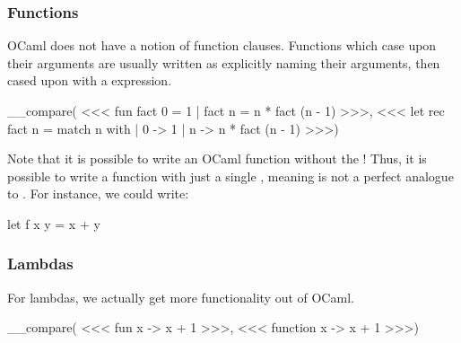 \documentclass[aspectratio=169, handout]{beamer}
\begin{document}
\begin{frame}[fragile]
  \frametitle{Functions}

  OCaml does not have a notion of function clauses. Functions which case upon
  their arguments are usually written as explicitly naming their arguments,
  then cased upon with a  expression.

  __compare(
<<<
  fun fact 0 = 1
    | fact n = n * fact (n - 1)
>>>,
<<<
  let rec fact n =
    match n with
    | 0 -> 1
    | n -> n * fact (n - 1)
>>>)

  \vspace{\fill}

  Note that it is possible to write an OCaml function without the !
  Thus, it is possible to write a function with just a single , meaning
   is not a perfect analogue to . For instance, we could
  write:

  \vspace{\fill}

  \begin{codeblock}
    let f x y = x + y
  \end{codeblock}
\end{frame}

\begin{frame}[fragile]
  \frametitle{Lambdas}

  For lambdas, we actually get more functionality out of OCaml.

  \vspace{\fill}


  \vspace{\fill}

  __compare(
<<<
  fun x -> x + 1
>>>,
<<<
  function x -> x + 1
>>>)
\end{frame}
\end{document}
